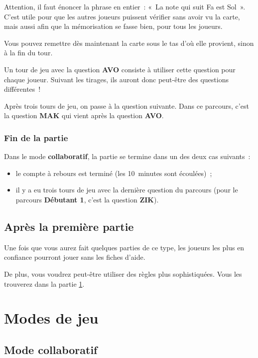 \documentclass[11pt]{article}
\newcommand{\parcours}[1]
{\textbf{#1}}
\newcommand{\QST}[1]
{\textbf{#1}}
\newcommand{\mode}[1]
{\textbf{#1}}
\begin{document}
Attention, il faut énoncer la phrase en entier : « La note qui suit Fa est
Sol ». C’est utile pour que les autres joueurs puissent vérifier sans avoir vu
la carte, mais aussi afin que la mémorisation se fasse bien, pour tous les
joueurs.

Vous pouvez remettre dès maintenant la carte sous le tas d’où elle provient,
sinon à la fin du tour.

Un tour de jeu avec la question \QST{AVO} consiste à utiliser cette question
pour chaque joueur. Suivant les tirages, ils auront donc peut-être des
questions différentes !

Après trois tours de jeu, on passe à la question suivante. Dans ce parcours,
c’est la question \QST{MAK} qui vient après la question \QST{AVO}.

\subsubsection{Fin de la partie}

Dans le mode \mode{collaboratif}, la partie se termine dans un des deux cas
suivants :

\begin{itemize}
    \item le compte à rebours est terminé (les 10 minutes sont écoulées) ;
    \item il y a eu trois tours de jeu avec la dernière question du parcours
        (pour le parcours \parcours{Débutant 1}, c’est la question \QST{ZIK}).
\end{itemize}

\subsection{Après la première partie}

Une fois que vous aurez fait quelques parties de ce type, les joueurs les plus
en confiance pourront jouer sans les fiches d’aide.

De plus, vous voudrez peut-être utiliser des règles plus sophistiquées. Vous
les trouverez dans la partie \ref{modes}.

\section{Modes de jeu} \label{modes}

\subsection{Mode collaboratif}
\end{document}
